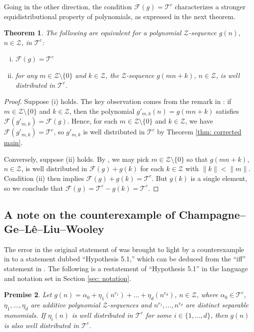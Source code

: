 \documentclass[11pt]{amsart}
\theoremstyle{theorem}
\newtheorem{theorem}{Theorem}[section]
\newtheorem{premise}[theorem]{Premise}
\theoremstyle{definition}
\newcommand{\mZ}{\mathcal{Z}}
\newcommand{\mT}{\mathcal{T}}
\newcommand{\mF}{\mathcal{F}}
\begin{document}
Going in the other direction, the condition $\mF(g) = \mT^c$ characterizes a stronger equidistributional property of polynomials, as expressed in the next theorem.

\begin{theorem} \label{thm: correct iff T^c}
    The following are equivalent for a polynomial $\mZ$-sequence $g(n)$, $n \in \mZ$, in $\mT^c$:
    \begin{enumerate}[(i)]
        \item $\mF(g) = \mT^c$
        \item for any $m \in \mZ \setminus \{0\}$ and $k \in \mZ$, the $\mZ$-sequence $g(mn+k)$, $n \in \mZ$, is well distributed in $\mT^c$.
    \end{enumerate}
\end{theorem}

\begin{proof}
    Suppose (i) holds.
    The key observation comes from the remark in \cite[p. 946]{bl}: if $m \in \mZ \setminus \{0\}$ and $k \in \mZ$, then the polynomial $g'_{m,k}(n) = g(mn+k)$ satisfies $\mF(g'_{m,k}) = \mF(g)$.
    Hence, for each $m \in \mZ \setminus \{0\}$ and $k \in \mZ$, we have $\mF(g'_{m,k}) = \mT^c$, so $g'_{m,k}$ is well distributed in $\mT^c$ by Theorem \ref{thm: corrected main}.

    Conversely, suppose (ii) holds.
    By \cite[Theorem 8.1]{bl}, we may pick $m \in \mZ \setminus \{0\}$ so that $g(mn+k)$, $n \in \mZ$, is well distributed in $\mF(g) + g(k)$ for each $k \in \mZ$ with $\|k\| < \|m\|$.
    Condition (ii) then implies $\mF(g) + g(k) = \mT^c$.
    But $g(k)$ is a single element, so we conclude that $\mF(g) = \mT^c - g(k) = \mT^c$.
\end{proof}


\subsection{A note on the counterexample of Champagne--Ge--L\^{e}--Liu--Wooley}

The error in the original statement of \cite[Theorem 0.3]{bl} was brought to light by a counterexample in \cite{cgllw} to a statement dubbed ``Hypothesis 5.1,'' which can be deduced from the ``iff'' statement in \cite[Theorem 0.3]{bl}.
The following is a restatement of ``Hypothesis 5.1'' in the language and notation set in Section \ref{sec: notation}.

\begin{premise} \label{premise}
	Let $g(n) = \alpha_0 + \eta_1(n^{r_1}) + \ldots + \eta_d(n^{r_d})$, $n \in \mZ$, where $\alpha_0 \in \mT^c$, $\eta_1, \ldots, \eta_d$ are additive polynomial $\mZ$-sequences and $n^{r_1}, \ldots, n^{r_d}$ are distinct separable monomials.
	If $\eta_i(n)$ is well distributed in $\mT^c$ for some $i \in \{1, \ldots, d\}$, then $g(n)$ is also well distributed in $\mT^c$.
\end{premise}
\end{document}
